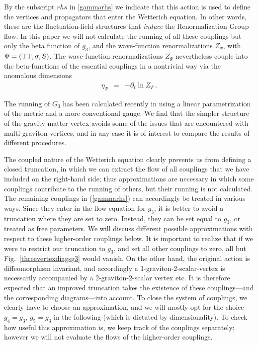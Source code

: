 \documentclass[11pt]{book} %
\newcommand{\bea}{\begin{eqnarray}}
\newcommand{\eea}{\end{eqnarray}}
\begin{document}
By the subscript $rhs$ in \eqref{gammarhs} we indicate that this action is used to define the
vertices and propagators that enter the Wetterich equation.
In other words, these are the fluctuation-field structures that \emph{induce} the Renormalization Group flow.
In this paper we will not calculate the running of all these couplings but only the beta function
of $g_3$, and the wave-function renormalizations $Z_\Psi$, with $\Psi=({\rm TT},\sigma,S)$.
The wave-function renormalizations $Z_\Psi$ nevertheless couple into the beta-functions of the
essential couplings in a nontrivial way via the anomalous dimensions
\bea
\eta_\Psi &=&-\partial_t\ln Z_\Psi\ .
\eea

The running of $G_3$ has been calculated recently in \cite{Meibohm:2015twa} using a linear
parametrization of the metric and a more conventional gauge.
We find that the simpler structure of the gravity-matter vertex avoids some of the issues that
are encountered with multi-graviton vertices,
and in any case it is of interest to compare the results of different procedures.

The coupled nature of the Wetterich equation clearly prevents us from defining a closed truncation,
in which we can extract the flow of all couplings that we have included on the right-hand side;
thus approximations are necessary in which some couplings contribute to the running of others,
but their running is not calculated.
The remaining couplings in (\ref{gammarhs}) can accordingly be treated in various ways.
Since they enter in the flow equation for $g_3$,
it is better to avoid a truncation where they are set to zero.
Instead, they can be set equal to $g_3$, or treated as free parameters.
We will discuss different possible approximations with respect to these higher-order couplings below.
It is important to realize that if we were to restrict our truncation to $g_3$,
and set all other couplings to zero, all but Fig.~\ref{threevertexdiagsg3} would vanish.
On the other hand, the original action is diffeomorphism invariant,
and accordingly a 1-graviton-2-scalar-vertex is necessarily accompanied by a 2-graviton-2-scalar vertex etc.
It is therefore expected that an improved truncation takes the existence of these couplings---and
the corresponding diagrams---into account.
To close the system of couplings, we clearly have to choose an approximation,
and we will mostly opt for the choice $g_4=g_3$, $g_5=g_3$ in the following
(which is dictated by dimensionality). To check how useful this approximation is,
we keep track of the couplings separately;
however we will not evaluate the flows of the higher-order couplings.
\end{document}
